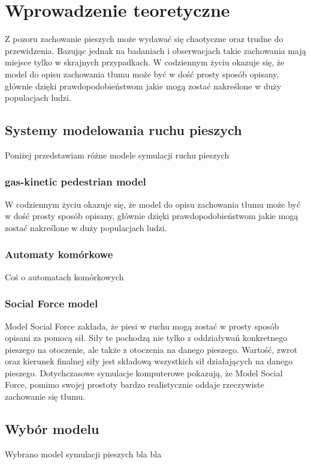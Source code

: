 \chapter{Wprowadzenie teoretyczne}
\label{cha:wprowadzenieTeoretyczne}

Z pozoru zachowanie pieszych może wydawać się chaotyczne oraz trudne do przewidzenia. Bazując jednak na badaniach i obserwacjach takie zachowania mają miejsce tylko w skrajnych przypadkach. W codziennym życiu okazuje się, że model do opisu zachowania tłumu może być w dość prosty sposób opisany, głównie dzięki prawdopodobieństwom jakie mogą zostać nakreślone w duży populacjach ludzi. 


\section{Systemy modelowania ruchu pieszych}
\label{sec:modeleSymulacji}

Poniżej przedstawiam różne modele symulacji ruchu pieszych

\subsection{gas-kinetic pedestrian model}

W codziennym życiu okazuje się, że model do opisu zachowania tłumu może być w dość prosty sposób opisany, głównie dzięki prawdopodobieństwom jakie mogą zostać nakreślone w duży populacjach ludzi. 

\subsection{Automaty komórkowe}

Coś o automatach komórkowych

\subsection{Social Force model}

Model Social Force zakłada, że piesi w ruchu mogą zostać w prosty sposób opisani za pomocą sił. Siły te pochodzą nie tylko z oddziaływań konkretnego pieszego na otoczenie, ale także z otoczenia na danego pieszego. Wartość, zwrot oraz kierunek finalnej siły jest składową wszystkich sił działających na danego pieszego. Dotychczasowe symulacje komputerowe pokazują, że Model Social Force, pomimo swojej prostoty bardzo realistycznie oddaje rzeczywiste zachowanie się tłumu.

\section{Wybór modelu}
\label{sec:wyborModelu}

Wybrano model symulacji pieszych bla bla


















